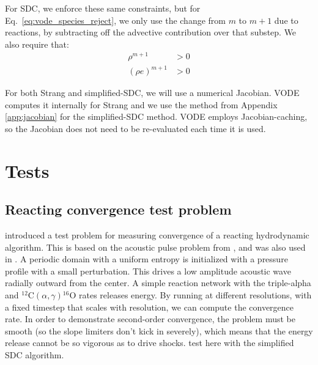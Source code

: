 \documentclass[times,preprint]{aastex63}
\newcommand{\isotm}[2]{{}^{#2}\mathrm{#1}}
\begin{document}
For SDC, we enforce these same constraints, but for
Eq.~\ref{eq:vode_species_reject}, we only use the change from $m$ to
$m+1$ due to reactions, by subtracting off the advective contribution
over that substep.  We also require that:
\begin{align}
\rho^{m+1} &> 0 \\
(\rho e)^{m+1} &> 0
\end{align}

For both Strang and simplified-SDC, we will use a numerical Jacobian.
VODE computes it internally for Strang and we use the method from
Appendix \ref{app:jacobian} for the simplified-SDC method.  VODE
employs Jacobian-caching, so the Jacobian does not need to be
re-evaluated each time it is used.


\section{Tests}

\subsection{Reacting convergence test problem}

\cite{castro_sdc} introduced a test problem for measuring convergence
of a reacting hydrodynamic algorithm.  This is based on the acoustic
pulse problem from \citep{mccorquodalecolella}, and was also used in
\citep{strang_rnaas}.  A periodic domain with a uniform entropy is
initialized with a pressure profile with a small perturbation.  This
drives a low amplitude acoustic wave radially outward from the center.
A simple reaction network with the triple-alpha and
$\isotm{C}{12}(\alpha,\gamma)\isotm{O}{16}$ rates releases energy.  By
running at different resolutions, with a fixed timestep that scales
with resolution, we can compute the convergence rate.  In order to
demonstrate second-order convergence, the problem must be smooth (so
the slope limiters don't kick in severely), which means that the
energy release cannot be so vigorous as to drive shocks.  test here
with the simplified SDC algorithm.




\end{document}
